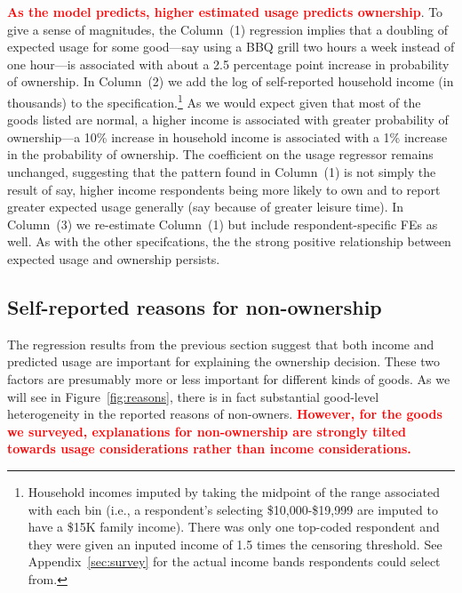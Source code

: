 \documentclass[11pt]{article}
\newcommand{\important}[1]{\textcolor{red}{\textbf{#1}}}
\newcommand{\important}[1]{#1}
\begin{document}


\important{As the model predicts, higher estimated usage predicts ownership}.
To give a sense of magnitudes, the Column~(1) regression implies that a doubling of expected usage for some good---say using a BBQ grill two hours a week instead of one hour---is associated with about a 2.5 percentage point increase in probability of ownership. 
In Column~(2) we add the log of self-reported household income (in thousands) to the specification.\footnote{
  Household incomes imputed by taking the midpoint of the range associated with each bin (i.e., a respondent's selecting \$10,000-\$19,999 are imputed to have a \$15K family income).
  There was only one top-coded respondent and they were given an inputed income of 1.5 times the censoring threshold.
  See Appendix~\ref{sec:survey} for the actual income bands respondents could select from.
  }
As we would expect given that most of the goods listed are normal, a higher income is associated with greater probability of ownership---a 10\% increase in household income is associated with a 1\% increase in the probability of ownership.  
The coefficient on the usage regressor remains unchanged, suggesting that the pattern found in Column~(1) is not simply the result of say, higher income respondents being more likely to own and to report greater expected usage generally (say because of greater leisure time). 
In Column~(3) we re-estimate Column~(1) but include respondent-specific FEs as well.
As with the other specifcations, the the strong positive relationship between expected usage and ownership persists. 

\subsection{Self-reported reasons for non-ownership}
The regression results from the previous section suggest that both income and predicted usage are important for explaining the ownership decision. 
These two factors are presumably more or less important for different kinds of goods.
As we will see in Figure~\ref{fig:reasons}, there is in fact substantial good-level heterogeneity in the reported reasons of non-owners.
\important{However, for the goods we surveyed, explanations for non-ownership are strongly tilted towards usage considerations rather than income considerations.}
\end{document}
